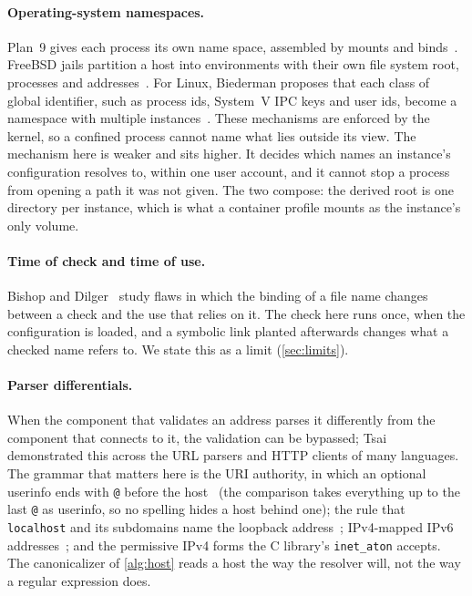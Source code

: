 \documentclass[11pt]{article}
\theoremstyle{plain}
\theoremstyle{definition}
\theoremstyle{remark}
\begin{document}
\paragraph{Operating-system namespaces.} Plan~9 gives each process its own name space, assembled by
mounts and binds~\cite{pike1993names}. FreeBSD jails partition a host into environments with their
own file system root, processes and addresses~\cite{kamp2000jails}. For Linux, Biederman proposes
that each class of global identifier, such as process ids, System~V IPC keys and user ids, become a
namespace with multiple instances~\cite{biederman2006}. These mechanisms are enforced by the
kernel, so a confined
process cannot name what lies outside its view. The mechanism here is weaker and sits higher. It
decides which names an instance's configuration resolves to, within one user account, and it cannot
stop a process from opening a path it was not given. The two compose: the derived root is one
directory per instance, which is what a container profile mounts as the instance's only volume.

\paragraph{Time of check and time of use.} Bishop and Dilger~\cite{bishop1996} study flaws in which
the binding of a file name changes between a check and the use that relies on it. The check here
runs once, when the configuration is loaded, and a symbolic link planted afterwards changes what a
checked name refers to. We state this as a limit (\cref{sec:limits}).

\paragraph{Parser differentials.} When the component that validates an address parses it
differently from the component that connects to it, the validation can be bypassed;
Tsai~\cite{tsai2017} demonstrated this across the URL parsers and HTTP clients of many languages.
The grammar that matters here is the URI authority, in which an optional userinfo ends with
\texttt{@} before the host~\cite{rfc3986} (the comparison takes everything up to the last
\texttt{@} as userinfo, so no spelling hides a host behind one); the rule that \texttt{localhost}
and its subdomains name the loopback
address~\cite{rfc6761}; IPv4-mapped IPv6 addresses~\cite{rfc4291}; and the permissive IPv4 forms the
C library's \texttt{inet\_aton} accepts. The canonicalizer of \cref{alg:host} reads a host the way
the resolver will, not the way a regular expression does.
\end{document}

